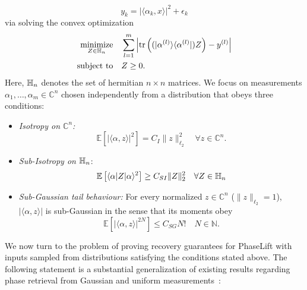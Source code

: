 \begin{equation}
y_k = \left| \langle \alpha_k,  x \rangle \right|^2 + \epsilon_k \label{eq:guarantee.measurements}
\end{equation}
via solving the convex optimization
\begin{align}
  \underset{{Z} \in \mathbb{H}_n}{\textrm{minimize}} & \quad \sum_{l=1}^m \left| \operatorname{tr} \left( (|\alpha^{(l)} \rangle \langle \alpha^{(l)} |) {Z} \right) - y^{(l)} \right| \label{eq:guarantee.phaselift} \\
   \textrm{subject to} &\quad  {Z} \geq 0. \nonumber
\end{align}
Here, $\mathbb{H}_n$ denotes the set of hermitian $n \times n$ matrices.
We focus on measurements $\alpha_1,\ldots,\alpha_m \in \mathbb{C}^n$ chosen independently from a distribution that obeys three conditions:
\begin{itemize}
\item \emph{Isotropy on $\mathbb{C}^n$:}
\begin{equation}
  \mathbb{E} \left[ | \langle \alpha,  z \rangle |^2 \right] = C_I \|  z \|_{\ell_2}^2 \quad \forall  z \in \mathbb{C}^n.
  \label{eq:tight_frame}
\end{equation}

\item \emph{Sub-Isotropy on $\mathbb{H}_n$}:
\begin{align}
  \mathbb{E} \left[ \langle \alpha |  Z | \alpha \rangle^2 \right] \geq C_{SI} \|  Z \|_2^2 \quad \forall  Z \in \mathbb{H}_n \label{eq:sub_isotropy}
\end{align}

\item \emph{Sub-Gaussian tail behaviour:} For every normalized $ z \in \mathbb{C}^n$ ($\|  z \|_{\ell_2}=1$), $| \langle \alpha,  z \rangle|$ is sub-Gaussian in the sense that its moments obey
\begin{equation}
  \mathbb{E} \left[ | \langle \alpha,  z \rangle|^{2N} \right] \leq C_{SG} N! \quad N \in \mathbb{N}.
\label{eq:subexponential}
\end{equation}
\end{itemize}

We now turn to the problem of proving recovery guarantees for PhaseLift with inputs sampled from distributions satisfying the conditions stated above.
The following statement is a substantial generalization of existing results regarding phase retrieval from Gaussian and uniform measurements~\cite{candes_solving_2012,demanet_stable_2014}:

